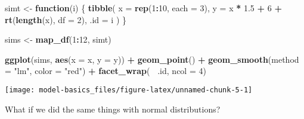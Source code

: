 \documentclass[]{book}
\newenvironment{Shaded}{\begin{snugshade}}{\end{snugshade}}
\newcommand{\ControlFlowTok}[1]{\textcolor[rgb]{0.13,0.29,0.53}{\textbf{#1}}}
\newcommand{\DataTypeTok}[1]{\textcolor[rgb]{0.13,0.29,0.53}{#1}}
\newcommand{\DecValTok}[1]{\textcolor[rgb]{0.00,0.00,0.81}{#1}}
\newcommand{\FloatTok}[1]{\textcolor[rgb]{0.00,0.00,0.81}{#1}}
\newcommand{\KeywordTok}[1]{\textcolor[rgb]{0.13,0.29,0.53}{\textbf{#1}}}
\newcommand{\NormalTok}[1]{#1}
\newcommand{\OperatorTok}[1]{\textcolor[rgb]{0.81,0.36,0.00}{\textbf{#1}}}
\newcommand{\StringTok}[1]{\textcolor[rgb]{0.31,0.60,0.02}{#1}}
\theoremstyle{definition}
\theoremstyle{definition}
\theoremstyle{definition}
\theoremstyle{remark}
\begin{document}
\begin{Shaded}
\begin{Highlighting}[]
\NormalTok{simt <-}\StringTok{ }\ControlFlowTok{function}\NormalTok{(i) \{}
  \KeywordTok{tibble}\NormalTok{(}
    \DataTypeTok{x =} \KeywordTok{rep}\NormalTok{(}\DecValTok{1}\OperatorTok{:}\DecValTok{10}\NormalTok{, }\DataTypeTok{each =} \DecValTok{3}\NormalTok{),}
    \DataTypeTok{y =}\NormalTok{ x }\OperatorTok{*}\StringTok{ }\FloatTok{1.5} \OperatorTok{+}\StringTok{ }\DecValTok{6} \OperatorTok{+}\StringTok{ }\KeywordTok{rt}\NormalTok{(}\KeywordTok{length}\NormalTok{(x), }\DataTypeTok{df =} \DecValTok{2}\NormalTok{),}
    \DataTypeTok{.id =}\NormalTok{ i}
\NormalTok{  )}
\NormalTok{\}}

\NormalTok{sims <-}\StringTok{ }\KeywordTok{map_df}\NormalTok{(}\DecValTok{1}\OperatorTok{:}\DecValTok{12}\NormalTok{, simt)}

\KeywordTok{ggplot}\NormalTok{(sims, }\KeywordTok{aes}\NormalTok{(}\DataTypeTok{x =}\NormalTok{ x, }\DataTypeTok{y =}\NormalTok{ y)) }\OperatorTok{+}
\StringTok{  }\KeywordTok{geom_point}\NormalTok{() }\OperatorTok{+}
\StringTok{  }\KeywordTok{geom_smooth}\NormalTok{(}\DataTypeTok{method =} \StringTok{"lm"}\NormalTok{, }\DataTypeTok{color =} \StringTok{"red"}\NormalTok{) }\OperatorTok{+}
\StringTok{  }\KeywordTok{facet_wrap}\NormalTok{(}\OperatorTok{~}\StringTok{ }\NormalTok{.id, }\DataTypeTok{ncol =} \DecValTok{4}\NormalTok{)}
\end{Highlighting}
\end{Shaded}

\begin{center}\texttt{[image: model-basics\_files/figure-latex/unnamed-chunk-5-1]} \end{center}

What if we did the same things with normal distributions?
\end{document}
